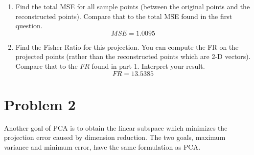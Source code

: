 \documentclass[letterpaper,10pt]{article}
\begin{document}
\begin{enumerate}
\begin{enumerate}
	\item Find the total MSE for all sample points (between the original points and the reconstructed points). Compare that to the total MSE found in the first question.
	$$MSE=1.0095$$
	
	\item Find the Fisher Ratio for this projection. You can compute the FR on the projected points (rather than the reconstructed points which are 2-D vectors). Compare that to the $FR$ found in part 1. Interpret your result.
	$$FR=13.5385$$
	
\end{enumerate}
\end{enumerate}

\section*{Problem 2}

Another goal of PCA is to obtain the linear subspace which minimizes the projection error caused by dimension reduction. The two goals, maximum variance and minimum error, have the same formulation as PCA.
\end{document}
